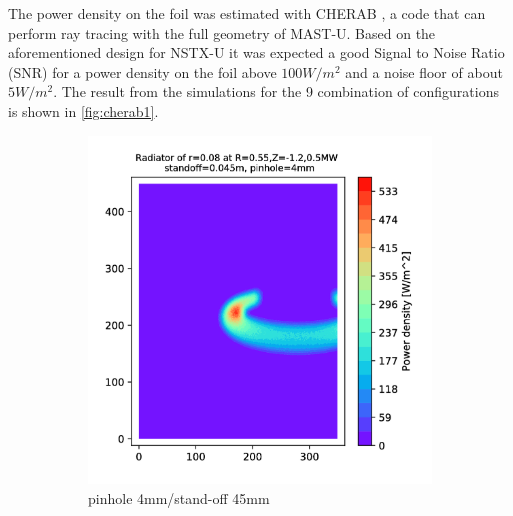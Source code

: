 The power density on the foil was estimated with CHERAB \cite{C.GiroudA.MeakinsM.CarrA.Baciero2018}\cite{Carr2017}\cite{A.MeakinsCarrM.2017}, a code that can perform ray tracing with the full geometry of MAST-U.  Based on the aforementioned design for NSTX-U it was expected a good Signal to Noise Ratio (SNR) for a power density on the foil above $100W/m^2$ and a noise floor of about $5W/m^2$. \cite{Reinke2018} The result from the simulations for the 9 combination of configurations is shown in \autoref{fig:cherab1}.

\begin{figure}
     \centering
     \begin{subfigure}{0.3\textwidth}
         \centering
         \includegraphics[trim={70 0 125 0},clip,width=\textwidth]{Chapters/chapter2/figs/4_45.png}
         \caption{pinhole 4mm/stand-off 45mm}
         \label{fig:4_45}
     \end{subfigure}
     \hfill
     \begin{subfigure}{0.3\textwidth}
         \centering

\end{subfigure}
\end{figure}
